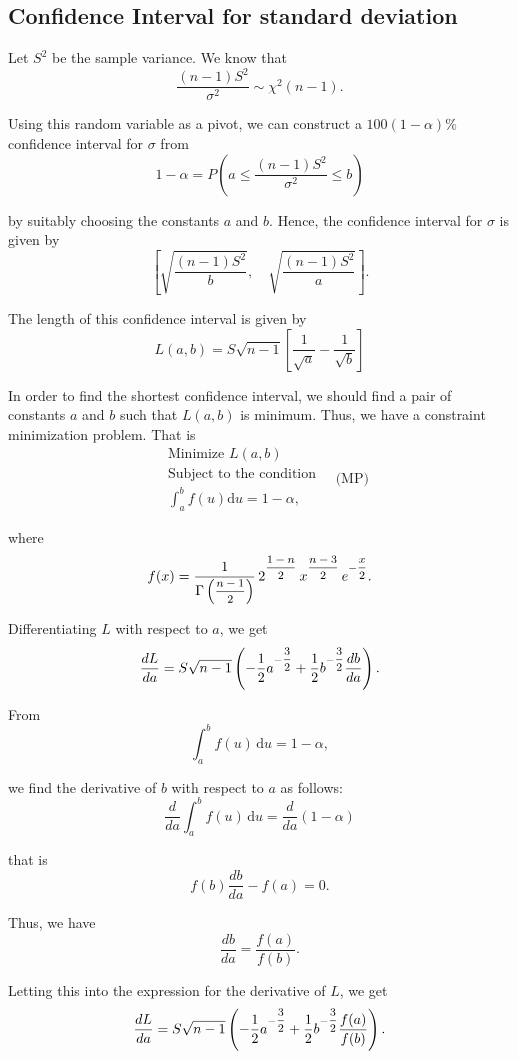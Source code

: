 \subsection{Confidence Interval for standard deviation}

Let $S^2$ be the sample variance. We know that
\[
    \frac{(n-1)S^2}{\sigma^2} \sim \chi^2(n-1).
\]

Using this random variable as a pivot, we can construct a $100(1-\alpha)\%$ confidence interval for $\sigma$ from
\[
1 - \alpha = P\left(a \leq \frac{(n-1)S^2}{\sigma^2} \leq b\right)
\]

by suitably choosing the constants $a$ and $b$. Hence, the confidence interval
for $\sigma$ is given by
\[
\left[\sqrt{\frac{(n-1)S^2}{b}},\quad \sqrt{\frac{(n-1)S^2}{a}}\right].
\]

The length of this confidence interval is given by
\[
L(a,b) = S\sqrt{n-1}\left[\frac{1}{\sqrt{a}} - \frac{1}{\sqrt{b}}\right]
\]

In order to find the shortest confidence interval, we should find a pair of
constants $a$ and $b$ such that $L(a,b)$ is minimum. Thus, we have a constraint
minimization problem. That is
\[
\begin{aligned}
&\text{Minimize } L(a,b)\\
&\text{Subject to the condition}\\
&\int_a^b f(u)\mathrm{d}u = 1 - \alpha,
\end{aligned}
\quad \text{(MP)}
\]

where
\[
f(x) = \frac{1}{\Gamma\left(\mfrac{n-1}{2}\right)}\, 2^{\mfrac{1-n}{2}}\, x^{\mfrac{n-3}{2}}\, e^{-\mfrac{x}{2}}.
\]

Differentiating $L$ with respect to $a$, we get
\[
\frac{dL}{da} = S\sqrt{n-1}\left(-\frac{1}{2}a^{-\mfrac{3}{2}} + \frac{1}{2}b^{-\mfrac{3}{2}}\frac{db}{da}\right).
\]

From
\[
\int_a^b f(u)\,\mathrm{d}u = 1 - \alpha,
\]

we find the derivative of $b$ with respect to $a$ as follows:
\[
\frac{d}{da}\int_a^b f(u)\,\mathrm{d}u = \frac{d}{da}(1-\alpha)
\]

that is
\[
f(b)\frac{db}{da} - f(a) = 0.
\]

Thus, we have
\[
\frac{db}{da} = \frac{f(a)}{f(b)}.
\]

Letting this into the expression for the derivative of $L$, we get
\[
\frac{dL}{da} = S\sqrt{n-1}\left(-\frac{1}{2}a^{-\mfrac{3}{2}} + \frac{1}{2}b^{-\mfrac{3}{2}}\frac{f(a)}{f(b)}\right).
\]

